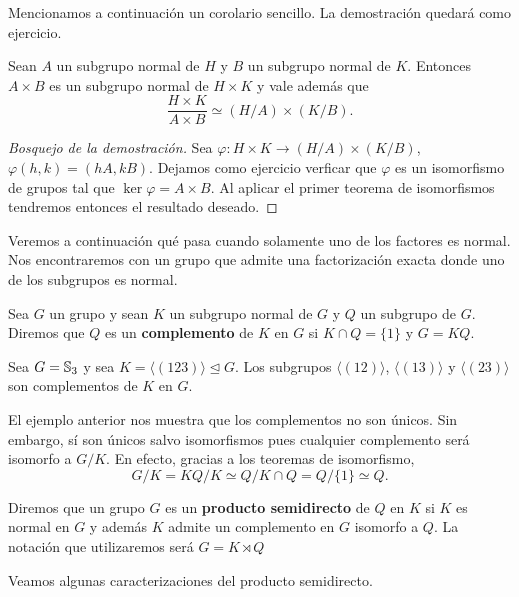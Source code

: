 Mencionamos a continuación un corolario sencillo. La demostración quedará como ejercicio. 

\begin{corollary}
Sean $A$ un subgrupo normal de $H$ y $B$ un subgrupo normal de $K$. Entonces $A\times B$ es un subgrupo normal de $H\times K$ y vale además que
\[
\frac{H\times K}{A\times B}\simeq(H/A)\times(K/B).
\]	
\end{corollary}

\begin{proof}[Bosquejo de la demostración]
Sea $\varphi\colon H\times K\to(H/A)\times(K/B)$, $\varphi(h,k)=(hA,kB)$. Dejamos como ejercicio verficar que $\varphi$ es un isomorfismo de grupos tal que $\ker\varphi=A\times B$. Al aplicar el primer teorema de isomorfismos tendremos entonces el resultado deseado. 
\end{proof}

Veremos a continuación qué pasa cuando solamente uno de los factores es normal. Nos encontraremos con un grupo que admite una factorización exacta donde uno de los subgrupos es normal.  

\begin{definition}
Sea $G$ un grupo y sean $K$ un subgrupo normal de $G$ y $Q$ un subgrupo de $G$. Diremos que $Q$ es un \textbf{complemento} de $K$ en $G$ si $K\cap Q=\{1\}$ y $G=KQ$.
\end{definition} 

\begin{example}
Sea $G=\mathbb{S}_3$ y sea $K=\langle (123)\rangle\unlhd G$. Los subgrupos $\langle (12)\rangle$, $\langle (13)\rangle$ y $\langle (23)\rangle$ son complementos de $K$ en $G$. 
\end{example}

El ejemplo anterior nos muestra que los complementos no son únicos. Sin embargo, sí son únicos salvo isomorfismos pues cualquier complemento será isomorfo a $G/K$. En efecto, gracias a los teoremas de isomorfismo, 
\[
G/K= KQ/K\simeq Q/K\cap Q=Q/\{1\}\simeq Q.
\] 

\begin{definition}
Diremos que un grupo $G$ es un \textbf{producto semidirecto} de $Q$ en $K$ si $K$ es normal en $G$ y además $K$ admite un complemento en $G$ isomorfo a $Q$. La notación que utilizaremos será $G=K\rtimes Q$
\end{definition}

Veamos algunas caracterizaciones del producto semidirecto. 

